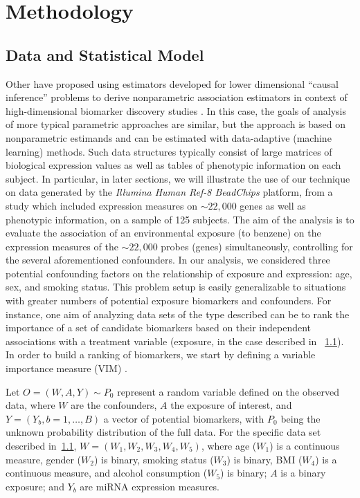 \chapter{Methodology}

\section{Data and Statistical Model}\label{data}

Other have proposed using estimators developed for lower dimensional ``causal
inference'' problems to derive nonparametric association estimators in context
of high-dimensional biomarker discovery studies \cite{tuglus2011targeted}. In
this case, the goals of analysis of more typical parametric approaches are
similar, but the approach is based on nonparametric estimands and can be
estimated with data-adaptive (machine learning) methods. Such data structures
typically consist of large matrices of biological expression values as well as
tables of phenotypic information on each subject. In particular, in later
sections, we will illustrate the use of our technique on data generated by the
\textit{Illumina Human Ref-8 BeadChips} platform, from a study which included
expression measures on $\sim 22,000$ genes as well as phenotypic information, on
a sample of 125 subjects. The aim of the analysis is to evaluate the association
of an environmental exposure (to benzene) on the expression measures of the
$\sim 22,000$ probes (genes) simultaneously, controlling for the several
aforementioned confounders. In our analysis, we considered three potential
confounding factors on the relationship of exposure and expression: age, sex,
and smoking status. This problem setup is easily generalizable to situations
with greater numbers of potential exposure biomarkers and confounders. For
instance, one  aim of analyzing data sets of the type described can be to rank
the importance of a set of candidate biomarkers based on their independent
associations with a treatment variable (exposure, in the case described in
~\ref{data}). In order to build a ranking of biomarkers, we start by defining a
variable importance measure (VIM) \cite{van2011targeted}.

Let $O = (W, A, Y) \sim P_{0}$ represent a random variable defined on the
observed data, where $W$ are the confounders, $A$ the exposure of interest,
and $Y=(Y_b, b = 1, \dots, B)$ a vector of potential biomarkers, with $P_{0}$
being the unknown probability distribution of the full data. For the specific
data set described in~\ref{data}, $W = (W_{1}, W_{2}, W_{3}, W_{4}, W_{5})$,
where age ($W_{1}$) is a continuous measure, gender ($W_{2}$) is binary,
smoking status ($W_{3}$) is binary, BMI ($W_{4}$) is a continuous measure, and
alcohol consumption ($W_{5}$) is binary; $A$ is a binary exposure; and $Y_{b}$
are miRNA expression measures.

